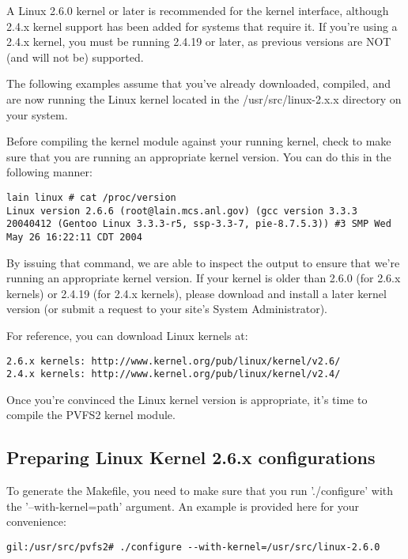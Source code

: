 \documentclass[11pt, letterpaper]{article}
\begin{document}
A Linux 2.6.0 kernel or later is recommended for the kernel interface,
although 2.4.x kernel support has been added for systems that require
it.  If you're using a 2.4.x kernel, you must be running 2.4.19 or
later, as previous versions are NOT (and will not be) supported.

The following examples assume that you've already downloaded,
compiled, and are now running the Linux kernel located in the
/usr/src/linux-2.x.x directory on your system.

Before compiling the kernel module against your running kernel, check
to make sure that you are running an appropriate kernel version.  You
can do this in the following manner:

\begin{verbatim}
lain linux # cat /proc/version 
Linux version 2.6.6 (root@lain.mcs.anl.gov) (gcc version 3.3.3
20040412 (Gentoo Linux 3.3.3-r5, ssp-3.3-7, pie-8.7.5.3)) #3 SMP Wed
May 26 16:22:11 CDT 2004
\end{verbatim}

By issuing that command, we are able to inspect the output to ensure
that we're running an appropriate kernel version.  If your kernel is
older than 2.6.0 (for 2.6.x kernels) or 2.4.19 (for 2.4.x kernels),
please download and install a later kernel version (or submit a
request to your site's System Administrator).

For reference, you can download Linux kernels at:
\begin{verbatim}
2.6.x kernels: http://www.kernel.org/pub/linux/kernel/v2.6/
2.4.x kernels: http://www.kernel.org/pub/linux/kernel/v2.4/
\end{verbatim}

Once you're convinced the Linux kernel version is appropriate, it's
time to compile the PVFS2 kernel module.

\subsection{Preparing Linux Kernel 2.6.x configurations}
\label{sec:vfs-configure}

To generate the Makefile, you need to make sure that you run
'./configure' with the '--with-kernel=path' argument.  An example is
provided here for your convenience:

\begin{verbatim}
gil:/usr/src/pvfs2# ./configure --with-kernel=/usr/src/linux-2.6.0
\end{verbatim}
\end{document}
